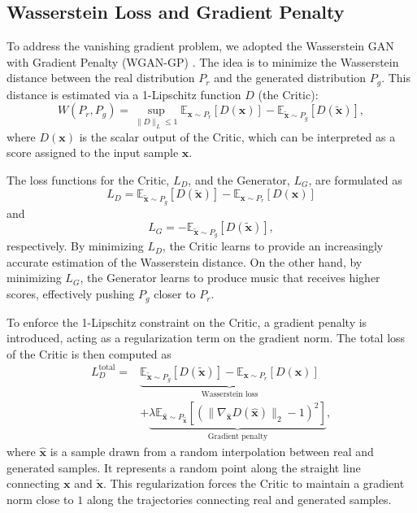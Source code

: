 \subsection{Wasserstein Loss and Gradient Penalty}
\label{sec:wasserstein_loss}

To address the vanishing gradient problem, we adopted the Wasserstein GAN with Gradient Penalty (WGAN-GP) \cite{Gulrajani-2017}.
The idea is to minimize the Wasserstein distance between the real distribution $P_r$ and the generated distribution $P_g$.
This distance is estimated via a 1-Lipschitz function $D$ (the Critic):
\begin{equation}
    W(P_r, P_g) = \sup_{\|D\|_L \leq 1} \mathbb{E}_{\bm{x} \sim P_r}[D(\bm{x})] - \mathbb{E}_{\tilde{\bm{x}} \sim P_g}[D(\tilde{\bm{x}})],
\end{equation}
where $D(\bm{x})$ is the scalar output of the Critic, which can be interpreted as a score assigned to the input sample $\bm{x}$.

The loss functions for the Critic, $L_D$, and the Generator, $L_G$, are formulated as
\begin{equation}
    L_D = \mathbb{E}_{\tilde{\bm{x}} \sim P_g}[D(\tilde{\bm{x}})] - \mathbb{E}_{\bm{x} \sim P_r}[D(\bm{x})]
\end{equation}
and
\begin{equation}
    L_G = -\mathbb{E}_{\tilde{\bm{x}} \sim P_g}[D(\tilde{\bm{x}})],
\end{equation}
respectively.
By minimizing $L_D$, the Critic learns to provide an increasingly accurate estimation of the Wasserstein distance.
On the other hand, by minimizing $L_G$, the Generator learns to produce music that receives higher scores, effectively pushing $P_g$ closer to $P_r$.

To enforce the 1-Lipschitz constraint on the Critic, a gradient penalty is introduced, acting as a regularization term on the gradient norm.
The total loss of the Critic is then computed as
\begin{equation}
    \begin{split}
        L_{D}^{\text{total}} = & \underbrace{\mathbb{E}_{\tilde{\bm{x}} \sim P_g}[D(\tilde{\bm{x}})] - \mathbb{E}_{\bm{x} \sim P_r}[D(\bm{x})]}_{\text{Wasserstein loss}}                                          \\
                               & + \underbrace{\lambda \mathbb{E}_{\hat{\bm{x}} \sim P_{\hat{\bm{x}}}} \left[ \left( \|\nabla_{\hat{\bm{x}}} D(\hat{\bm{x}})\|_2 - 1 \right)^2 \right]}_{\text{Gradient penalty}},
    \end{split}
\end{equation}
where $\hat{\bm{x}}$ is a sample drawn from a random interpolation between real and generated samples.
It represents a random point along the straight line connecting $\bm{x}$ and $\tilde{\bm{x}}$.
This regularization forces the Critic to maintain a gradient norm close to $1$ along the trajectories connecting real and generated samples.

